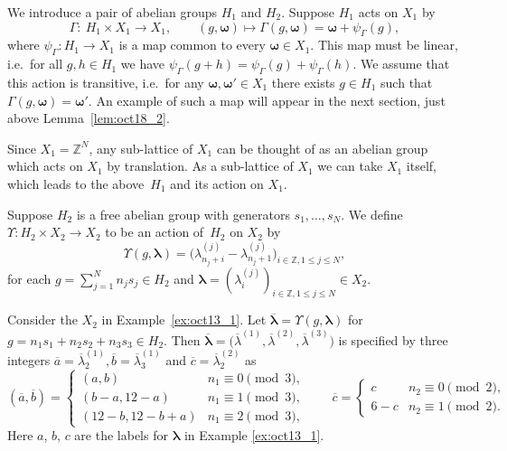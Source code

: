 \documentclass[11pt]{article}
\newcommand{\Z}{{\mathbb Z}}
\newcommand\bom{\boldsymbol{\omega}}
\newcommand\bol{\boldsymbol{\lambda}}
\begin{document}
We introduce a pair of abelian groups $H_1$ and $H_2$.
Suppose $H_1$ acts on $X_1$
by
\begin{displaymath}
\varGamma : \ H_1 \times X_1 \rightarrow X_1, \qquad
(g , \bom) \mapsto \varGamma (g , \bom) = \bom + \psi_{\varGamma} (g),
\end{displaymath}
where $\psi_{\varGamma}: H_1 \rightarrow X_1$ is a map common to every $\bom \in X_1$.
This map must be linear, i.e.~for all $g, h \in H_1$ we have $\psi_{\varGamma}(g+h) = \psi_{\varGamma}(g) + \psi_{\varGamma}(h)$.
We assume that this action is transitive, i.e.~for any $\bom, \bom' \in X_1$ there exists $g \in H_1$ such that $\varGamma (g , \bom) = \bom'$.
An example of such a map will appear in the next section, just above Lemma~\ref{lem:oct18_2}.
\begin{remark}
Since $X_1 = \Z^N$, any sub-lattice of $X_1$ can be thought of as an abelian group which
acts on $X_1$ by translation.
As a sub-lattice of $X_1$ we can take $X_1$ itself, which leads to the above~$H_1$ and its action on $X_1$.
\end{remark}

Suppose $H_2$ is a free abelian group with generators $s_1, \ldots , s_N$.
We def\/ine $\Upsilon: H_2 \times X_2 \rightarrow X_2$ to be an action of~$H_2$ on $X_2$ by
\begin{equation}\label{eq:mar24_1}
\Upsilon (g,\bol) = \big(\lambda^{(j)}_{n_j + i}- \lambda^{(j)}_{n_j + 1}\big)_{i \in \Z, 1 \leq j \leq N},
\end{equation}
for each $g = \sum_{j=1}^N n_j s_j\in H_2$ and
$\bol = (\lambda^{(j)}_i)_{i \in \Z, 1 \leq j \leq N} \in X_2$.

\begin{example}\label{ex:oct15_1}
Consider the $X_2$ in Example~\ref{ex:oct13_1}.
Let $\overline{\bol} = \Upsilon (g,\bol)$
for $g = n_1 s_1 + n_2 s_2 + n_3 s_3 \in H_2$.
Then
$\overline{\bol} = \big(\overline{\lambda}^{(1)}, \overline{\lambda}^{(2)},\overline{\lambda}^{(3)}\big)$ is specif\/ied by three integers
$\overline{a}=\overline{\lambda}^{(1)}_2, \overline{b}=\overline{\lambda}^{(1)}_3$
and $\overline{c}=\overline{\lambda}^{(2)}_2$ as
\begin{equation*}
(\overline{a}, \overline{b}) =
\begin{cases}
(a,b) & n_1 \equiv 0 \pmod{3},\\
(b-a, 12-a) & n_1 \equiv 1 \pmod{3},\\
(12-b, 12-b+a) & n_1 \equiv 2 \pmod{3},
\end{cases}
\qquad
\overline{c} =
\begin{cases}
c & n_2 \equiv 0 \pmod{2},\\
6-c & n_2 \equiv 1 \pmod{2}.
\end{cases}
\end{equation*}
Here $a$, $b$, $c$ are the labels for $\bol$ in Example \ref{ex:oct13_1}.
\end{example}
\end{document}
